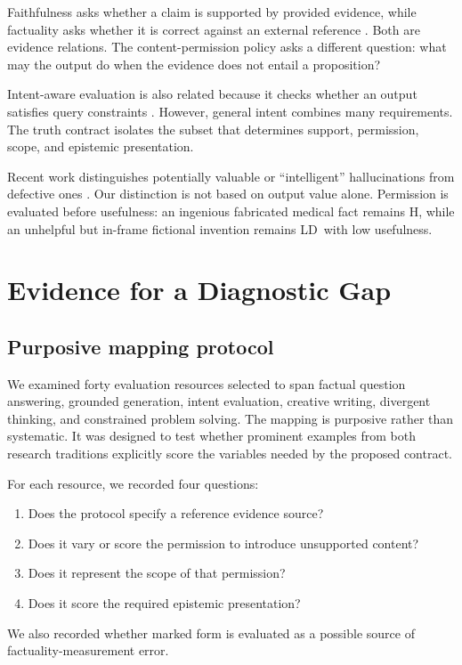 \documentclass{clv2025}
\newcommand{\LD}{\textsc{LD}}
\newcommand{\Hall}{\textsc{H}}
\begin{document}
Faithfulness asks whether a claim is supported by provided evidence, while factuality asks whether it is correct against an external reference \citep{maynez_faithfulness_2020,kryscinski_evaluating_2020}.
Both are evidence relations.
The content-permission policy asks a different question: what may the output do when the evidence does not entail a proposition?

Intent-aware evaluation is also related because it checks whether an output satisfies query constraints \citep{hao_faithqa_2025}.
However, general intent combines many requirements.
The truth contract isolates the subset that determines support, permission, scope, and epistemic presentation.

Recent work distinguishes potentially valuable or ``intelligent'' hallucinations from defective ones \citep{jiang_survey_2024,sui_confabulation_2024,yang_hicbench_2025}.
Our distinction is not based on output value alone.
Permission is evaluated before usefulness: an ingenious fabricated medical fact remains \Hall, while an unhelpful but in-frame fictional invention remains \LD\ with low usefulness.

\section{Evidence for a Diagnostic Gap}\label{sec:audit}

\subsection{Purposive mapping protocol}

We examined forty evaluation resources selected to span factual question answering, grounded generation, intent evaluation, creative writing, divergent thinking, and constrained problem solving.
The mapping is purposive rather than systematic.
It was designed to test whether prominent examples from both research traditions explicitly score the variables needed by the proposed contract.

For each resource, we recorded four questions:
\begin{enumerate}
  \item Does the protocol specify a reference evidence source?
  \item Does it vary or score the permission to introduce unsupported content?
  \item Does it represent the scope of that permission?
  \item Does it score the required epistemic presentation?
\end{enumerate}
We also recorded whether marked form is evaluated as a possible source of factuality-measurement error.
\end{document}
